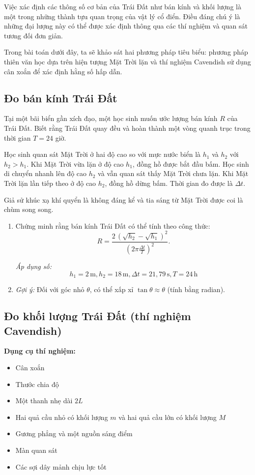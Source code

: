 
Việc xác định các thông số cơ bản của Trái Đất như bán kính và khối lượng là một trong những thành tựu quan trọng của vật lý cổ điển. Điều đáng chú ý là những đại lượng này có thể được xác định thông qua các thí nghiệm và quan sát tương đối đơn giản.

Trong bài toán dưới đây, ta sẽ khảo sát hai phương pháp tiêu biểu: phương pháp thiên văn học dựa trên hiện tượng Mặt Trời lặn và thí nghiệm Cavendish sử dụng cân xoắn để xác định hằng số hấp dẫn.
\subsection*{Đo bán kính Trái Đất}
Tại một bãi biển gần xích đạo, một học sinh muốn ước lượng bán kính \(R\) của Trái Đất. Biết rằng Trái Đất quay đều và hoàn thành một vòng quanh trục trong thời gian \(T = 24\) giờ.  

Học sinh quan sát Mặt Trời ở hai độ cao so với mực nước biển là \(h_1\) và \(h_2\) với \(h_2>h_1\). Khi Mặt Trời vừa lặn ở độ cao \(h_1\), đồng hồ được bắt đầu bấm. Học sinh di chuyển nhanh lên độ cao \(h_2\) và vẫn quan sát thấy Mặt Trời chưa lặn. Khi Mặt Trời lặn lần tiếp theo ở độ cao \(h_2\), đồng hồ dừng bấm. Thời gian đo được là \(\Delta t\).  

Giả sử khúc xạ khí quyển là không đáng kể và tia sáng từ Mặt Trời được coi là chùm song song.

\begin{enumerate}
\item Chứng minh rằng bán kính Trái Đất có thể tính theo công thức:
\[
R = \frac{2 \, (\sqrt{h_2} - \sqrt{h_1})^2}{\left( 2 \pi \frac{\Delta t}{T} \right)^2}.
\]

\emph{Áp dụng số:}
\[
h_1 = 2\,\text{m}, h_2 = 18\,\text{m}, \Delta t = 21{,}79\,\text{s}, T = 24\,\text{h}
\]

\item \emph{Gợi ý:} Đối với góc nhỏ \(\theta\), có thể xấp xỉ \(\tan\theta \approx \theta\) (tính bằng radian).
\end{enumerate}

\vspace{8pt}

\subsection*{Đo khối lượng Trái Đất (thí nghiệm Cavendish)}

\textbf{Dụng cụ thí nghiệm:}
\begin{itemize}
    \item Cân xoắn
    \item Thước chia độ
    \item Một thanh nhẹ dài \(2L\)
    \item Hai quả cầu nhỏ có khối lượng \(m\) và hai quả cầu lớn có khối lượng \(M\)
    \item Gương phẳng và một nguồn sáng điểm
    \item Màn quan sát
    \item Các sợi dây mảnh chịu lực tốt
\end{itemize}

